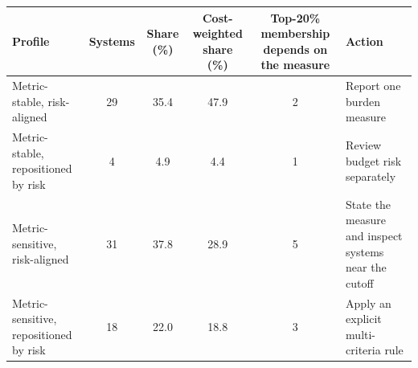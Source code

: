 \begin{tabular}{p{4.6cm}cccc p{4.2cm}}
\toprule
Profile & Systems & Share (\%) & Cost-weighted share (\%) & Top-20\% membership depends on the measure & Action \\
\midrule
Metric-stable, risk-aligned & 29 & 35.4 & 47.9 & 2 & Report one burden measure \\
Metric-stable, repositioned by risk & 4 & 4.9 & 4.4 & 1 & Review budget risk separately \\
Metric-sensitive, risk-aligned & 31 & 37.8 & 28.9 & 5 & State the measure and inspect systems near the cutoff \\
Metric-sensitive, repositioned by risk & 18 & 22.0 & 18.8 & 3 & Apply an explicit multi-criteria rule \\
\bottomrule
\end{tabular}
